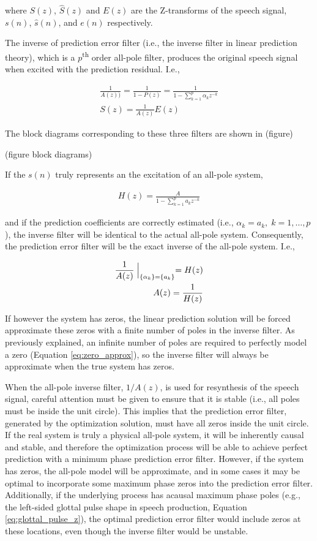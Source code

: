\noindent
where $S(z)$, $\hat{S}(z)$ and $E(z)$ are the Z-transforms of the speech signal, $s(n)$, $\hat{s}(n)$, and $e(n)$ respectively.

The inverse of prediction error filter (i.e., the inverse filter in linear prediction theory), which is a $p$\textsuperscript{th} order all-pole filter, produces the original speech signal when excited with the prediction residual. I.e.,

\begin{eqnarray}
	\frac{1}{A(z))} = \frac{1}{1 - P(z)} = \frac{1}{1 - \sum_{k=1}^{p}\alpha_k z^{-k}} \\
	S(z) = \frac{1}{A(z)} E(z)
\end{eqnarray}

The block diagrams corresponding to these three filters are shown in (figure)

(figure block diagrams)

If the $s(n)$ truly represents an the excitation of an all-pole system,  

\begin{eqnarray}
	H(z) = \frac{A}{1 - \sum_{k=1}^{p}a_k z^{-k}}
\end{eqnarray}

\noindent
and if the prediction coefficients are correctly estimated (i.e., $\alpha_k=a_k, \; k=1,\dots,p$), the inverse filter will be identical to the actual all-pole system. Consequently, the prediction error filter will be the exact inverse of the all-pole system. I.e.,

\begin{eqnarray}
	\frac{1}{A(z)}\Bigm|_{\{\alpha_k\}=\{a_k\}}=H(z) \\
	A(z)=\frac{1}{H(z)}
\end{eqnarray}

If however the system has zeros, the linear prediction solution will be forced approximate these zeros with a finite number of poles in the inverse filter. As previously explained, an infinite number of poles are required to perfectly model a zero (Equation \ref{eq:zero_approx}), so the inverse filter will always be approximate when the true system has zeros.

When the all-pole inverse filter, $1/A(z)$,  is used for resynthesis of the speech signal, careful attention must be given to ensure that it is stable (i.e., all poles must be inside the unit circle). This implies that the prediction error filter, generated by the optimization solution, must have all zeros inside the unit circle. If the real system is truly a physical all-pole system, it will be inherently causal and stable, and therefore the optimization process will be able to achieve perfect prediction with a minimum phase prediction error filter. However, if the system has zeros, the all-pole model will be approximate, and in some cases it may be optimal to incorporate some maximum phase zeros into the prediction error filter. Additionally, if the underlying process has acausal maximum phase poles (e.g., the left-sided glottal pulse shape in speech production, Equation \ref{eq:glottal_pulse_z}), the optimal prediction error filter would include zeros at these locations, even though the inverse filter would be unstable.


